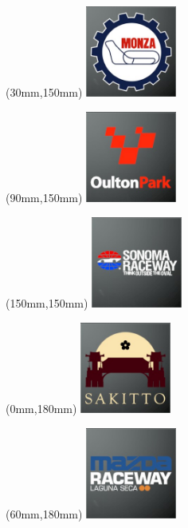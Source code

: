 \begin{textblock*}{30mm}(30mm,150mm)%
\includegraphics[width=30mm]{LG/2015-05-20_00086.png}
\end{textblock*}
\begin{textblock*}{30mm}(90mm,150mm)%
\includegraphics[width=30mm]{LG/2015-05-20_00091.png}
\end{textblock*}
\begin{textblock*}{30mm}(150mm,150mm)%
\includegraphics[width=30mm]{LG/2015-05-20_00096.png}
\end{textblock*}
\begin{textblock*}{30mm}(0mm,180mm)%
\includegraphics[width=30mm]{LG/2015-05-20_00093.png}
\end{textblock*}
\begin{textblock*}{30mm}(60mm,180mm)%
\includegraphics[width=30mm]{LG/2015-05-20_00085.png}
\end{textblock*}

